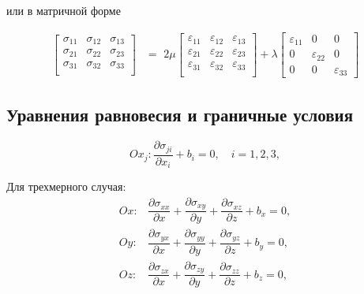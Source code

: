 \documentclass[12pt,a4paper]{article}
\begin{document}
  \noindent или в матричной форме

  \[
    \begin{split}
      \begin{bmatrix}
        \sigma_{11} & \sigma_{12} & \sigma_{13} \\
        \sigma_{21} & \sigma_{22} & \sigma_{23} \\
        \sigma_{31} & \sigma_{32} & \sigma_{33} \\
      \end{bmatrix}
      &= \,\,
      2\mu \begin{bmatrix}
        \varepsilon_{11} & \varepsilon_{12} & \varepsilon_{13} \\
        \varepsilon_{21} & \varepsilon_{22} & \varepsilon_{23} \\
        \varepsilon_{31} & \varepsilon_{32} & \varepsilon_{33} \\
      \end{bmatrix}
      + \lambda \begin{bmatrix}
        \varepsilon_{11} & 0 & 0 \\
        0 & \varepsilon_{22} & 0 \\ 
        0 & 0 & \varepsilon_{33} 
        \end{bmatrix}
    \end{split}
  \]

  \subsection{Уравнения равновесия и граничные условия}
  \begin{equation}
    Ox_j\colon \dfrac{\partial \sigma_{ji}}{\partial x_i} + b_i = 0, \quad i = 1, 2, 3,
    \label{equillibrium}
  \end{equation}

  Для трехмерного случая:
  \[
    \begin{split}
      Ox\colon& \dfrac{\partial \sigma_{xx}}{\partial x} + \dfrac{\partial \sigma_{xy}}{\partial y} + \dfrac{\partial \sigma_{xz}}{\partial z} + b_x = 0, \\[0.5em]
      Oy\colon& \dfrac{\partial \sigma_{yx}}{\partial x} + \dfrac{\partial \sigma_{yy}}{\partial y} + \dfrac{\partial \sigma_{yz}}{\partial z} + b_y = 0, \\[0.5em]
      Oz\colon& \dfrac{\partial \sigma_{zx}}{\partial x} + \dfrac{\partial \sigma_{zy}}{\partial y} + \dfrac{\partial \sigma_{zz}}{\partial z} + b_z = 0, \\[0.5em]
    \end{split}
  \]
\end{document}
